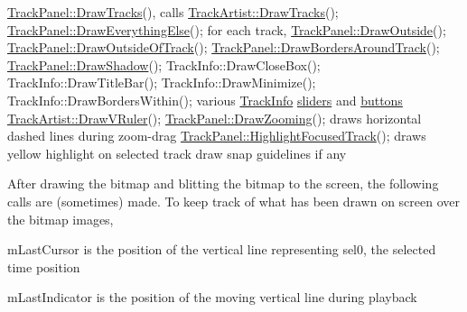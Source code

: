 \begin{DoxyCode}
\hyperlink{class_track_panel_aaa5b6851ca776625e829a355d685910e}{TrackPanel::DrawTracks}(), calls
       \hyperlink{class_track_artist_aecb43569c2de2e9e2cae4584ffd80a5f}{TrackArtist::DrawTracks}();
       \hyperlink{class_track_panel_a501152ed41888644ff3a289f8f431785}{TrackPanel::DrawEverythingElse}();
               \textcolor{keywordflow}{for each} track,
                       \hyperlink{class_track_panel_a663b8756796c9ab91e2ed95245920503}{TrackPanel::DrawOutside}();
                               \hyperlink{class_track_panel_a4c73d580495e4908ab6632bf8530e3a5}{TrackPanel::DrawOutsideOfTrack}();
                               \hyperlink{class_track_panel_a2294cb4b4ea67022ec0ff96ef66f0a70}{TrackPanel::DrawBordersAroundTrack}();
                               \hyperlink{class_track_panel_ae675db226f9ccb85b9c682f774b0cc7e}{TrackPanel::DrawShadow}();
                               TrackInfo::DrawCloseBox();
                               TrackInfo::DrawTitleBar();
                               TrackInfo::DrawMinimize();
                               TrackInfo::DrawBordersWithin();
                               various \hyperlink{class_track_info}{TrackInfo} \hyperlink{slider_8h_a8681fab1acbd292fff23dd726563ddeb}{sliders} and 
      \hyperlink{winmain_8cpp_aa4250fecc19d9977f24b66fdac73f301}{buttons}
                       \hyperlink{class_track_artist_aa5b19d1f05fa5297ed4a97c179a3b658}{TrackArtist::DrawVRuler}();
               \hyperlink{class_track_panel_a53b862fc7f4eb461445429ad6b28a81e}{TrackPanel::DrawZooming}();
                       draws horizontal dashed lines during zoom-drag
               \hyperlink{class_track_panel_ab579d3634b223e60ceed553cd41f4791}{TrackPanel::HighlightFocusedTrack}();
                       draws yellow highlight on selected track
               draw snap guidelines \textcolor{keywordflow}{if} any
\end{DoxyCode}


After drawing the bitmap and blitting the bitmap to the screen, the following calls are (sometimes) made. To keep track of what has been drawn on screen over the bitmap images, \begin{DoxyItemize}
\item {\ttfamily m\+Last\+Cursor} is the position of the vertical line representing sel0, the selected time position \item {\ttfamily m\+Last\+Indicator} is the position of the moving vertical line during playback\end{DoxyItemize}

